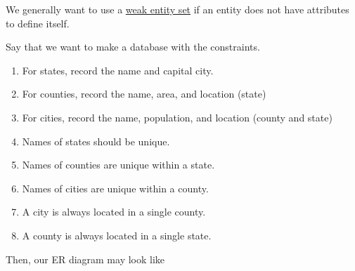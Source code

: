   We generally want to use a \hyperref[def:weak-entity-set]{weak entity set} if an entity does not have attributes to define itself. 
  
  \begin{example}
    \label{ex:designing-a-schema-from-constraints}
    Say that we want to make a database with the constraints. 
    \begin{enumerate}
      \item For states, record the name and capital city. 
      \item For counties, record the name, area, and location (state) 
      \item For cities, record the name, population, and location (county and state) 
      \item Names of states should be unique. 
      \item Names of counties are unique within a state. 
      \item Names of cities are unique within a county. 
      \item A city is always located in a single county. 
      \item A county is always located in a single state. 
    \end{enumerate}
    Then, our ER diagram may look like 

    \begin{figure}[H]
      \centering 
\end{figure}
\end{example}
